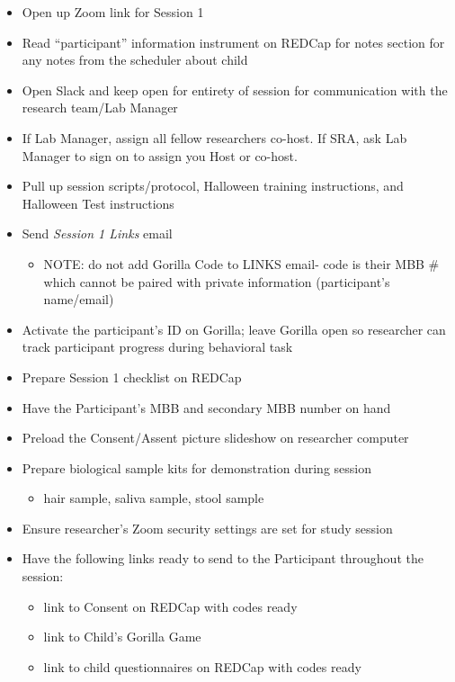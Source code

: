 \documentclass[]{book}
\providecommand{\tightlist}{%
  \setlength{\itemsep}{0pt}\setlength{\parskip}{0pt}}
\begin{document}
\begin{itemize}
\tightlist
\item
  Open up Zoom link for Session 1
\item
  Read ``participant'' information instrument on REDCap for notes section for any notes from the scheduler about child
\item
  Open Slack and keep open for entirety of session for communication with the research team/Lab Manager
\item
  If Lab Manager, assign all fellow researchers co-host. If SRA, ask Lab Manager to sign on to assign you Host or co-host.
\item
  Pull up session scripts/protocol, Halloween training instructions, and Halloween Test instructions
\item
  Send \emph{Session 1 Links} email

  \begin{itemize}
  \tightlist
  \item
    NOTE: do not add Gorilla Code to LINKS email- code is their MBB \# which cannot be paired with private information (participant's name/email)
  \end{itemize}
\item
  Activate the participant's ID on Gorilla; leave Gorilla open so researcher can track participant progress during behavioral task
\item
  Prepare Session 1 checklist on REDCap
\item
  Have the Participant's MBB and secondary MBB number on hand
\item
  Preload the Consent/Assent picture slideshow on researcher computer
\item
  Prepare biological sample kits for demonstration during session

  \begin{itemize}
  \tightlist
  \item
    hair sample, saliva sample, stool sample
  \end{itemize}
\item
  Ensure researcher's Zoom security settings are set for study session
\item
  Have the following links ready to send to the Participant throughout the session:

  \begin{itemize}
  \tightlist
  \item
    link to Consent on REDCap with codes ready
  \item
    link to Child's Gorilla Game
  \item
    link to child questionnaires on REDCap with codes ready
  \end{itemize}
\end{itemize}
\end{document}
